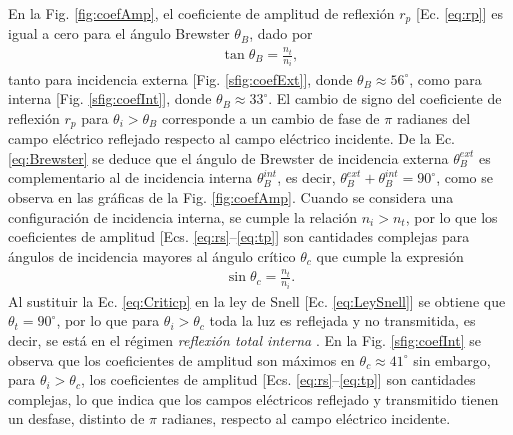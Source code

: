 En la Fig. \ref{fig:coefAmp}, el coeficiente de amplitud de reflexión $r_p$ [Ec. \eqref{eq:rp}] es igual a cero para el ángulo Brewster $\theta_B$, dado por \cite{hecht1998optics} 
%
	\begin{align}
	\tan\theta_B = \frac{n_t}{n_i},
	\label{eq:Brewster}
	\end{align}
%	
tanto para incidencia externa [Fig. \ref{sfig:coefExt}], donde $\theta_B \approx 56^\circ$, como para interna [Fig. \ref{sfig:coefInt}], donde $\theta_B \approx 33^\circ$. El cambio de signo del coeficiente de reflexión $r_p$ para $\theta_i>\theta_B$ corresponde a un cambio de fase de $\pi$ radianes del campo eléctrico reflejado respecto al campo eléctrico incidente. De la Ec. \eqref{eq:Brewster} se deduce que el ángulo de Brewster de incidencia externa $\theta_B^{ext}$ es complementario al de incidencia interna $\theta_B^{int}$, es decir, $\theta_B^{ext}+\theta_B^{int} = 90^\circ$, como se observa en las gráficas de la Fig. \ref{fig:coefAmp}. Cuando se considera una configuración de incidencia interna, se cumple la relación $n_i>n_t$, por lo que los coeficientes de amplitud  [Ecs. \eqref{eq:rs}--\eqref{eq:tp}] son cantidades complejas para ángulos de incidencia mayores al ángulo crítico $\theta_c$ que cumple la expresión \cite{hecht1998optics}
% 
	\begin{align}
	\sin\theta_c = \frac{n_t}{n_i}.
	\label{eq:Criticp}
	\end{align}
%
Al sustituir la Ec. \eqref{eq:Criticp} en la ley de Snell [Ec. \eqref{eq:LeySnell}] se obtiene que $\theta_t = 90^\circ$, por lo que para $\theta_i>\theta_c$ toda la luz es reflejada y no transmitida, es decir, se está en el régimen \emph{reflexión total interna} . En la Fig. \ref{sfig:coefInt} se observa que los coeficientes de amplitud son máximos en $\theta_c \approx 41^\circ$ sin embargo, para $\theta_i>\theta_c$, los coeficientes de amplitud  [Ecs. \eqref{eq:rs}--\eqref{eq:tp}] son cantidades complejas, lo que indica que los campos eléctricos reflejado y transmitido tienen un desfase, distinto de $\pi$ radianes, respecto al campo eléctrico incidente.  

